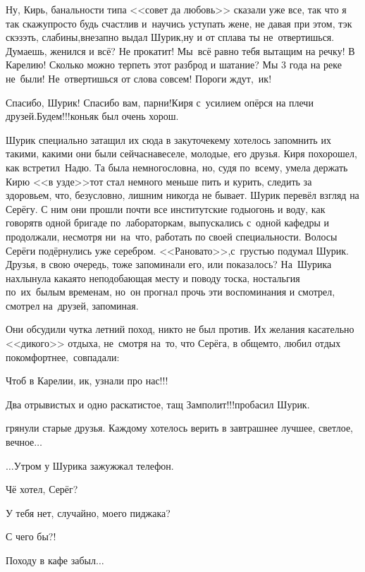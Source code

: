 {\diagdash Ну, Кирь, банальности типа <<совет да любовь>> сказали уже все, так что я так скажу\mdash просто будь счастлив и~научись уступать жене, не давая при этом, тэк скэзэть, слабины,\mdash внезапно выдал Шурик,\mdash ну и от сплава ты не~отвертишься. Думаешь, женился и всё? Не прокатит! Мы~всё равно тебя вытащим на речку! В Карелию! Сколько можно терпеть этот разброд и шатание? Мы 3 года на реке не~были! Не~отвертишься от слова совсем! Пороги ждут,~ик!

\diagdash Спасибо, Шурик! Спасибо вам, парни!\mdash Киря с~усилием опёрся на плечи друзей.\mdash Будем!!!\mdash коньяк был очень хорош.

Шурик специально затащил их сюда в закуточек\mdash ему хотелось запомнить их такими, какими они были сейчас\mdash навеселе, молодые, его друзья. Киря похорошел, как встретил~Надю. Та была немногословна, но, судя по~всему, умела держать Кирю <<в узде>>\mdash тот стал немного меньше пить и курить, следить за здоровьем, что, безусловно, лишним никогда не бывает. Шурик перевёл взгляд на Серёгу. С ним они прошли почти все институтские годы\mdash огонь и воду, как говорят\mdash в одной бригаде по~лабораторкам, выпускались с~одной кафедры и продолжали, несмотря ни~на~что, работать по своей специальности. Волосы Серёги подёрнулись уже серебром. <<Рановато>>,\mdash с~грустью подумал Шурик. Друзья, в свою очередь, тоже запоминали его, или показалось? На~Шурика нахлынула какая\sdash то неподобающая месту и поводу тоска, ностальгия по~их~былым временам, но~он прогнал прочь эти воспоминания и смотрел, смотрел на~друзей, запоминая.  

Они обсудили чутка летний поход, никто не был против. Их желания касательно <<дикого>> отдыха, не~смотря на~то, что Серёга, в общем\sdash то, любил отдых покомфортнее,~совпадали:

\diagdash Чтоб в Карелии, ик, узнали про нас!!!%

\diagdash Два отрывистых и одно раскатистое, тащ Замполит!!!\mdash пробасил Шурик.

\mdash грянули старые друзья. Каждому хотелось верить в завтрашнее лучшее, светлое, вечное$\ldots$

\vspace{2.0cm}
$\ldots$Утром у Шурика зажужжал телефон. 

\diagdash Чё хотел, Серёг?

\diagdash У тебя нет, случайно, моего пиджака?

\diagdash С чего бы?!

\diagdash Походу в кафе забыл$\ldots$

\begin{center}
\end{center}
}
